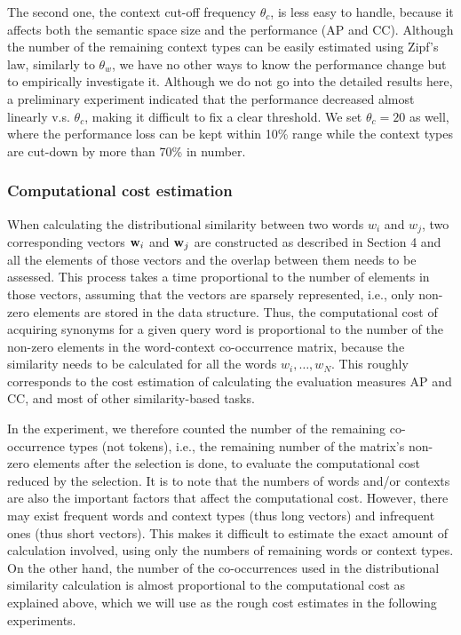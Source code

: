 \documentclass[english]{jnlp_1.4}
\begin{document}
The second one, the context cut-off frequency $\theta_c$, is less easy
to handle, because it affects both the semantic space size and the
performance (AP and CC). Although the number of the remaining context
types can be easily estimated using Zipf's law, similarly to
$\theta_w$, we have no other ways to know the performance change but
to empirically investigate it. Although we do not go into the detailed
results here, a preliminary experiment indicated that the performance
decreased almost linearly v.s. $\theta_c$, making it difficult to fix
a clear threshold. We set $\theta_c = 20$ as well, where the
performance loss can be kept within 10\% range while the context types
are cut-down by more than 70\% in number.


\subsubsection{Computational cost estimation}


When calculating the distributional similarity between two words
{$w_i$} and {$w_j$}, two corresponding vectors {${\bf w}_i$} and
{${\bf w}_j$} are constructed as described in Section 4 and all the
elements of those vectors and the overlap between them needs to be
assessed. This process takes a time proportional to the number of
elements in those vectors, assuming that the vectors are sparsely
represented, i.e., only non-zero elements are stored in the data
structure. Thus, the computational cost of acquiring synonyms for a
given query word is proportional to the number of the non-zero
elements in the word-context co-occurrence matrix, because the
similarity needs to be calculated for all the words {$w_i, \ldots,
w_N$}. This roughly corresponds to the cost estimation of calculating
the evaluation measures AP and CC, and most of other similarity-based
tasks.


In the experiment, we therefore counted the number of the remaining
co-occurrence types (not tokens), i.e., the remaining number of the
matrix's non-zero elements after the selection is done, to evaluate
the computational cost reduced by the selection. It is to note that
the numbers of words and/or contexts are also the important factors
that affect the computational cost. However, there may exist frequent
words and context types (thus long vectors) and infrequent ones (thus
short vectors). This makes it difficult to estimate the exact amount
of calculation involved, using only the numbers of remaining words or
context types. On the other hand, the number of the co-occurrences
used in the distributional similarity calculation is almost
proportional to the computational cost as explained above, which we
will use as the rough cost estimates in the following experiments.
\end{document}

